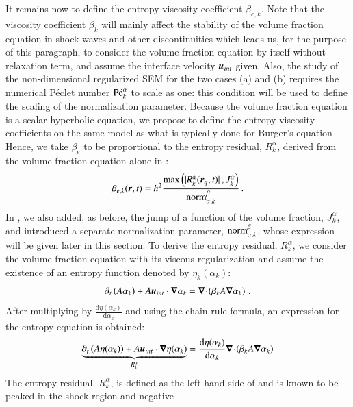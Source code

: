 \documentclass[preprint,10pt]{elsarticle}
\begin{document}
It remains now to define the entropy viscosity coefficient $\beta_{e,k}$. Note that the viscosity coefficient $\beta_k$ will mainly affect the stability of the volume fraction equation in shock waves and other discontinuities which leads us, for the purpose of this paragraph, to consider the volume fraction equation 
by itself without relaxation term, and assume the interface velocity $\boldsymbol u_{int}$ given. Also, the study of the non-dimensional regularized SEM for the two cases (a) and (b) requires the numerical P\'eclet number $\textrm{P\'e}_k^\alpha$ to scale as one: this condition will be used to define the scaling of the normalization parameter.
Because the volume fraction equation is a scalar hyperbolic equation, we propose to define the entropy viscosity coefficients on the same model as 
what is typically done for Burger's equation \cite{GuermondJCP2011, GuermondCSE2011}. Hence, we take $\beta_e$ to be proportional to the entropy residual, $R_{k}^\alpha$, derived from the 
volume fraction equation alone in :
%
\begin{align}\label{eq:def-beta-sen-sect4}
\beta_{e,k}( \boldsymbol r, t) = h^2 \frac{\max\left( | R_{k}^\alpha(\boldsymbol r_q,t) |\,,  J_k^\alpha \right)}{\textrm{norm}_{\alpha, k}^\beta} \, .
\end{align}
%
In , we also added, as before, the jump of a function of the volume fraction, $J_k^\alpha$, and
introduced a separate normalization parameter, $\textrm{norm}_{\alpha,k}^\beta$, whose expression will be given later in this section. To derive the 
entropy residual, $ R_{k}^\alpha$, 
we consider the volume fraction equation with its viscous regularization and assume the existence of an entropy function denoted by $\eta_k(\alpha_k)$:
%
\begin{equation}\label{eq:vf-sem-sct4}
\partial_t \left(A \alpha_k \right) + A \boldsymbol u_{int} \cdot \boldsymbol\nabla \alpha_k = \boldsymbol\nabla\! \cdot \! \left( \beta_k A \boldsymbol\nabla \alpha_k \right) \, .
\end{equation}
% 
After multiplying by $\frac{\text{d} \eta (\alpha_k)}{\text{d} \alpha_k}$ and using the chain rule formula, an expression for the entropy equation is obtained:
%
\begin{equation}\label{eq:vf-sem2-sct4}
\underbrace{\partial_t \left(A \eta(\alpha_k) \right) + A \boldsymbol u_{int} \cdot \boldsymbol\nabla \eta(\alpha_k)}_{R_{k}^\alpha} = \frac{\text{d} \eta (\alpha_k)}{\text{d} \alpha_k} 
\boldsymbol\nabla\! \cdot \! \left( \beta_k A \boldsymbol\nabla \alpha_k \right)
\end{equation}
% 
The entropy residual, $R_{k}^\alpha$, is defined as the left hand side of  and is known to be peaked in the shock region and negative 
\end{document}
